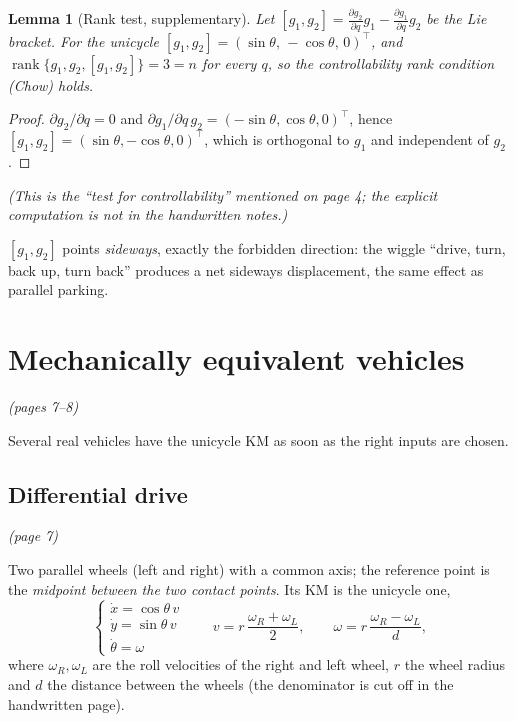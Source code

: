 \documentclass[11pt,a4paper]{article}
\DeclareMathOperator{\rank}{rank}
\theoremstyle{definition}
\theoremstyle{plain}
\newtheorem{lemma}[definition]{Lemma}
\theoremstyle{remark}
\begin{document}
\begin{lemma}[Rank test, supplementary]\label{rem:chow}
Let $[g_1,g_2]=\frac{\partial g_2}{\partial q}g_1-\frac{\partial g_1}{\partial q}g_2$ be the Lie bracket. For the unicycle $[g_1,g_2]=(\sin\theta,\,-\cos\theta,\,0)^{\!\top}$, and $\rank\{g_1,g_2,[g_1,g_2]\}=3=n$ for every $q$, so the controllability rank condition (Chow) holds.
\end{lemma}
\begin{proof}
$\partial g_2/\partial q=0$ and $\partial g_1/\partial q\,g_2=(-\sin\theta,\cos\theta,0)^{\!\top}$, hence $[g_1,g_2]=(\sin\theta,-\cos\theta,0)^{\!\top}$, which is orthogonal to $g_1$ and independent of $g_2$.
\end{proof}
\noindent\emph{(This is the ``test for controllability'' mentioned on page 4; the explicit computation is not in the handwritten notes.)}

\begin{intuition}
$[g_1,g_2]$ points \emph{sideways}, exactly the forbidden direction: the wiggle ``drive, turn, back up, turn back'' produces a net sideways displacement, the same effect as parallel parking.
\end{intuition}

\section{Mechanically equivalent vehicles}\emph{(pages 7--8)}

Several real vehicles have the unicycle KM as soon as the right inputs are chosen.

\subsection{Differential drive}\emph{(page 7)}

Two parallel wheels (left and right) with a common axis; the reference point is the \emph{midpoint between the two contact points}. Its KM is the unicycle one,
\[
\begin{cases}\dot x=\cos\theta\,v\\ \dot y=\sin\theta\,v\\ \dot\theta=\omega\end{cases}
\qquad
v=r\,\frac{\omega_R+\omega_L}{2},\qquad \omega=r\,\frac{\omega_R-\omega_L}{d},
\]
where $\omega_R,\omega_L$ are the roll velocities of the right and left wheel, $r$ the wheel radius and $d$ the distance between the wheels (the denominator is cut off in the handwritten page).
\end{document}
